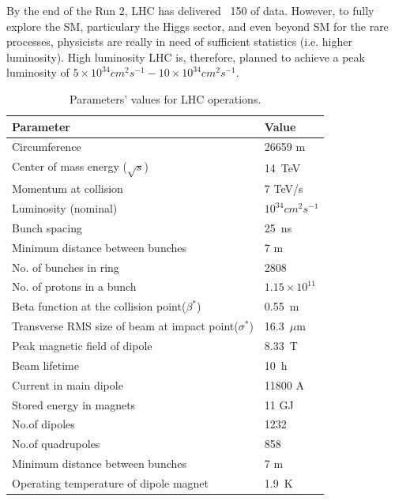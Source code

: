 By the end of the Run 2, LHC has delivered ~150 \ifb  of data. However, to fully explore the SM, particulary the Higgs sector, and even beyond SM for the rare processes, physicists are really in need of sufficient statistics (i.e. higher luminosity).
High luminosity LHC is, therefore, planned to achieve a peak luminosity of $5 \times 10^{34} cm^{2}s^{-1} - 10 \times  10^{34} cm^{2}s^{-1}$.
\begin{table}
\begin{center}
\caption{Parameters' values for LHC operations.}
\label{Tab:nominal_lumi_parameters}
\begin{tabular}{ll}
  \hline
  Parameter & Value \\ \hline
  Circumference & 26659 m \\
  Center of mass energy ($\sqrt{s}$) & 14~TeV \\
  Momentum at collision & 7 TeV/s \\
  Luminosity (nominal) & $10^{34} cm^2s^{-1}$ \\
  Bunch spacing & 25~ns \\
  Minimum distance between bunches & 7 m \\
  No. of bunches in ring & 2808 \\
  No. of protons in a bunch & $1.15\times 10^{11}$\\
  Beta function at the collision point($\beta^{\ast}$)& 0.55~m \\
  Transverse RMS size of beam at impact point($\sigma^{\ast}$) & 16.3~$\mu$m  \\
  Peak magnetic field of dipole & 8.33~T \\
  Beam lifetime & 10~h \\
  Current in  main dipole & 11800 A \\
  Stored energy in magnets & 11 GJ \\
  No.of dipoles & 1232 \\
  No.of quadrupoles & 858 \\
  Minimum distance between bunches & 7 m \\
  Operating temperature of dipole magnet    & 1.9~K \\ \hline
\end{tabular}
\end{center}
\end{table}

